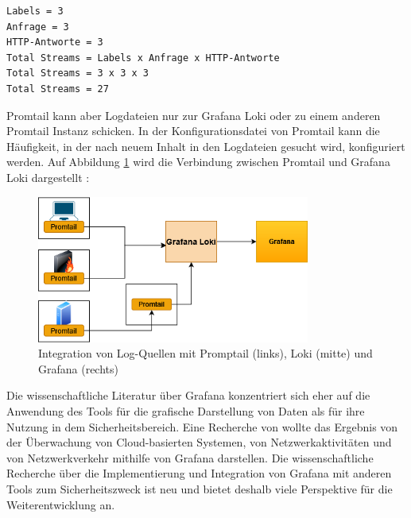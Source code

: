 {
\begin{Verbatim}[commandchars=\\\{\},frame=single]
Labels = 3
Anfrage = 3
HTTP-Antworte = 3
Total Streams = Labels x Anfrage x HTTP-Antworte
Total Streams = 3 x 3 x 3
Total Streams = 27
\end{Verbatim}
}

Promtail kann aber Logdateien nur zur Grafana Loki oder zu einem anderen Promtail Instanz schicken. In der Konfigurationsdatei von Promtail kann die Häufigkeit, in der nach neuem Inhalt in den Logdateien gesucht wird, konfiguriert werden. Auf Abbildung \ref{fig:Integration_Loki_Promtail_Grafana} wird die Verbindung zwischen Promtail und Grafana Loki dargestellt \citep{Grafana_Logs}:


\begin{figure}[H]
   \centering
   \includegraphics[width=0.8\textwidth]{assets/Promtail.png}
   \caption[Integration von Log-Quellen mit Promptail, Loki und Grafana]
   {Integration von Log-Quellen mit Promptail (links), Loki (mitte) und Grafana (rechts)}
   \label{fig:Integration_Loki_Promtail_Grafana}
   \centering
\end{figure}

Die wissenschaftliche Literatur über Grafana konzentriert sich eher auf die Anwendung des Tools für die grafische Darstellung von Daten als für ihre Nutzung in dem Sicherheitsbereich. Eine Recherche von \cite{Manases_grafananetwork} wollte das Ergebnis von der Überwachung von Cloud-basierten Systemen, von Netzwerkaktivitäten und von Netzwerkverkehr mithilfe von Grafana darstellen.
Die wissenschaftliche Recherche über die Implementierung und Integration von Grafana mit anderen Tools zum Sicherheitszweck ist neu und bietet deshalb viele  Perspektive für die Weiterentwicklung an.


